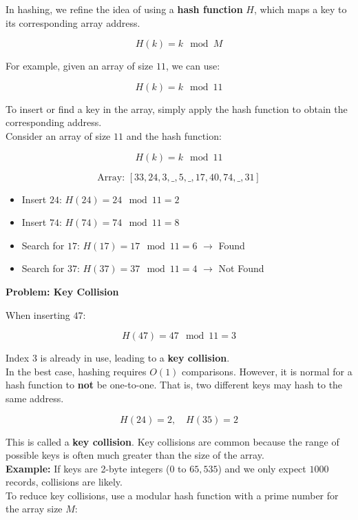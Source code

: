 \documentclass[a4paper,12pt]{article}
\begin{document}
In hashing, we refine the idea of using a \textbf{hash function} \(H\), which maps a key to its corresponding array address.

\[
H(k) = k \mod M
\]

For example, given an array of size \(11\), we can use:

\[
H(k) = k \mod 11
\]

To insert or find a key in the array, simply apply the hash function to obtain the corresponding address.\\

Consider an array of size \(11\) and the hash function:

\[
H(k) = k \mod 11
\]

\[
\text{Array: } [ 33, 24, 3, \_, 5, \_, 17, 40, 74, \_, 31 ]
\]

\begin{itemize}
    \item Insert \(24\): \(H(24) = 24 \mod 11 = 2\)
    \item Insert \(74\): \(H(74) = 74 \mod 11 = 8\)
    \item Search for \(17\): \(H(17) = 17 \mod 11 = 6\) \(\rightarrow\) Found
    \item Search for \(37\): \(H(37) = 37 \mod 11 = 4\) \(\rightarrow\) Not Found
\end{itemize}

\textbf{Problem: Key Collision}

When inserting \(47\):

\[
H(47) = 47 \mod 11 = 3
\]

Index 3 is already in use, leading to a \textbf{key collision}.\\

In the best case, hashing requires \(O(1)\) comparisons. However, it is normal for a hash function to \textbf{not} be one-to-one. That is, two different keys may hash to the same address.

\[
H(24) = 2, \quad H(35) = 2
\]

This is called a \textbf{key collision}. Key collisions are common because the range of possible keys is often much greater than the size of the array.\\

\textbf{Example:} If keys are 2-byte integers (\(0\) to \(65,535\)) and we only expect \(1000\) records, collisions are likely.\\

To reduce key collisions, use a modular hash function with a prime number for the array size \(M\):
\end{document}
